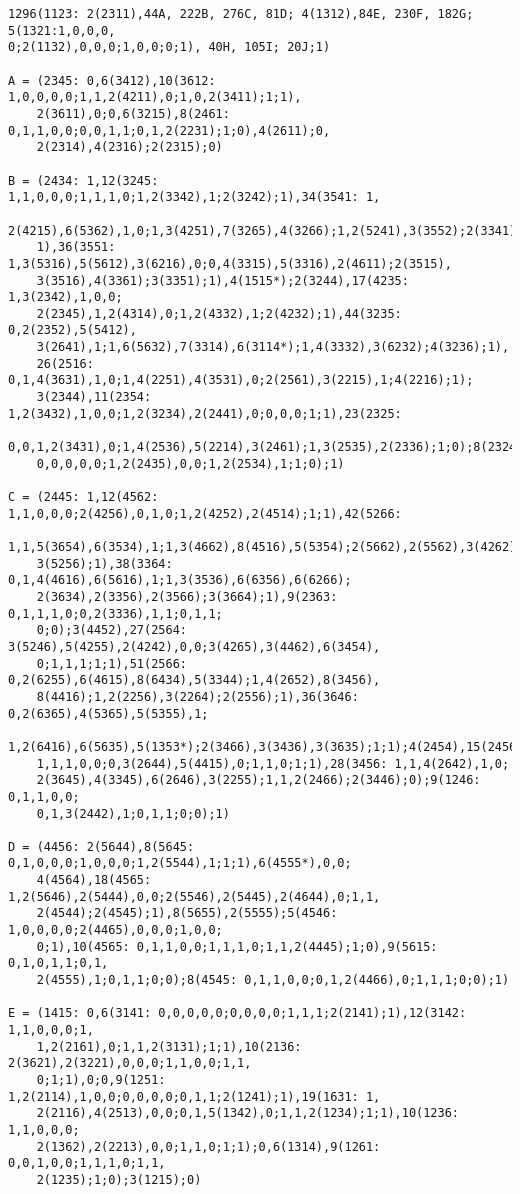 \scriptsize
\begin{verbatim}
1296(1123: 2(2311),44A, 222B, 276C, 81D; 4(1312),84E, 230F, 182G; 5(1321:1,0,0,0,
0;2(1132),0,0,0;1,0,0;0;1), 40H, 105I; 20J;1)

A = (2345: 0,6(3412),10(3612: 1,0,0,0,0;1,1,2(4211),0;1,0,2(3411);1;1),
    2(3611),0;0,6(3215),8(2461: 0,1,1,0,0;0,0,1,1;0,1,2(2231);1;0),4(2611);0,
    2(2314),4(2316);2(2315);0)

B = (2434: 1,12(3245: 1,1,0,0,0;1,1,1,0;1,2(3342),1;2(3242);1),34(3541: 1,
    2(4215),6(5362),1,0;1,3(4251),7(3265),4(3266);1,2(5241),3(3552);2(3341);
    1),36(3551: 1,3(5316),5(5612),3(6216),0;0,4(3315),5(3316),2(4611);2(3515),
    3(3516),4(3361);3(3351);1),4(1515*);2(3244),17(4235: 1,3(2342),1,0,0;
    2(2345),1,2(4314),0;1,2(4332),1;2(4232);1),44(3235: 0,2(2352),5(5412),
    3(2641),1;1,6(5632),7(3314),6(3114*);1,4(3332),3(6232);4(3236);1),
    26(2516: 0,1,4(3631),1,0;1,4(2251),4(3531),0;2(2561),3(2215),1;4(2216);1);
    3(2344),11(2354: 1,2(3432),1,0,0;1,2(3234),2(2441),0;0,0,0;1;1),23(2325: 
    0,0,1,2(3431),0;1,4(2536),5(2214),3(2461);1,3(2535),2(2336);1;0);8(2324: 
    0,0,0,0,0;1,2(2435),0,0;1,2(2534),1;1;0);1)

C = (2445: 1,12(4562: 1,1,0,0,0;2(4256),0,1,0;1,2(4252),2(4514);1;1),42(5266: 
    1,1,5(3654),6(3534),1;1,3(4662),8(4516),5(5354);2(5662),2(5562),3(4262);
    3(5256);1),38(3364: 0,1,4(4616),6(5616),1;1,3(3536),6(6356),6(6266);
    2(3634),2(3356),2(3566);3(3664);1),9(2363: 0,1,1,1,0;0,2(3336),1,1;0,1,1;
    0;0);3(4452),27(2564: 3(5246),5(4255),2(4242),0,0;3(4265),3(4462),6(3454),
    0;1,1,1;1;1),51(2566: 0,2(6255),6(4615),8(6434),5(3344);1,4(2652),8(3456),
    8(4416);1,2(2256),3(2264);2(2556);1),36(3646: 0,2(6365),4(5365),5(5355),1;
    1,2(6416),6(5635),5(1353*);2(3466),3(3436),3(3635);1;1);4(2454),15(2456: 
    1,1,1,0,0;0,3(2644),5(4415),0;1,1,0;1;1),28(3456: 1,1,4(2642),1,0;
    2(3645),4(3345),6(2646),3(2255);1,1,2(2466);2(3446);0);9(1246: 0,1,1,0,0;
    0,1,3(2442),1;0,1,1;0;0);1)

D = (4456: 2(5644),8(5645: 0,1,0,0,0;1,0,0,0;1,2(5544),1;1;1),6(4555*),0,0;
    4(4564),18(4565: 1,2(5646),2(5444),0,0;2(5546),2(5445),2(4644),0;1,1,
    2(4544);2(4545);1),8(5655),2(5555);5(4546: 1,0,0,0,0;2(4465),0,0,0;1,0,0;
    0;1),10(4565: 0,1,1,0,0;1,1,1,0;1,1,2(4445);1;0),9(5615: 0,1,0,1,1;0,1,
    2(4555),1;0,1,1;0;0);8(4545: 0,1,1,0,0;0,1,2(4466),0;1,1,1;0;0);1)

E = (1415: 0,6(3141: 0,0,0,0,0;0,0,0,0;1,1,1;2(2141);1),12(3142: 1,1,0,0,0;1,
    1,2(2161),0;1,1,2(3131);1;1),10(2136: 2(3621),2(3221),0,0,0;1,1,0,0;1,1,
    0;1;1),0;0,9(1251: 1,2(2114),1,0,0;0,0,0,0;0,1,1;2(1241);1),19(1631: 1,
    2(2116),4(2513),0,0;0,1,5(1342),0;1,1,2(1234);1;1),10(1236: 1,1,0,0,0;
    2(1362),2(2213),0,0;1,1,0;1;1);0,6(1314),9(1261: 0,0,1,0,0;1,1,1,0;1,1,
    2(1235);1;0);3(1215);0)


\end{verbatim}
